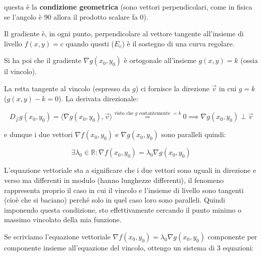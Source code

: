 \documentclass[../appunti-analisi.tex]{subfiles}
\begin{document}
questa è la \textbf{condizione geometrica} (sono vettori perpendicolari, come in fisica se l'angolo è 90 allora il prodotto scalare fa 0).

Il gradiente è, in ogni punto, perpendicolare al vettore tangente all'insieme di livello $f(x,y) = c$ quando questi ($E_c$) è il sostegno di una curva regolare.

Si ha poi che il gradiente $\nabla g(x_0,y_0)$ è ortogonale all'insieme $g(x,y) = k$ (ossia il vincolo).


La retta tangente al vincolo (espresso da $g$) ci fornisce la direzione $\vec{v}$ in cui $g=k$ ($g(x,y) -k=0$). La derivata direzionale:

\[
    D_{\vec{v}} g(x_0,y_0) = \langle \nabla g(x_0,y_0), \vec{v} \rangle \overset{\text{visto che $g$ costantemente $=k$}}{=} 0 \implies \nabla g(x_0,y_0) \perp \vec{v}
\]

e dunque i due vettori $\nabla f(x_0,y_0)$ e $\nabla g(x_0,y_0)$ sono paralleli quindi:

\[
\exists \lambda_0 \in \mathbb{R}: \nabla f(x_0,y_0) = \lambda_0 \nabla g(x_0,y_0)
\]



L'equazione vettoriale sta a significare che i due vettori sono uguali in direzione e verso ma differenti in modulo (hanno lunghezze differenti), il fenomeno rappresenta proprio il caso in cui il vincolo e l'insieme di livello sono tangenti (cioè che si baciano) perché solo in quel caso loro sono paralleli. Quindi imponendo questa condizione, sto effettivamente cercando il punto minimo o massimo vincolato della mia funzione.


Se scriviamo l'equazione vettoriale $\nabla f(x_0,y_0) = \lambda_0 \nabla g(x_0,y_0)$ componente per componente insieme all'equazione del vincolo, ottengo un sistema di 3 equazioni:
\end{document}

